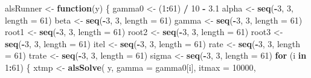 \documentclass[
  12pt,
]{article}
\newenvironment{Shaded}{\begin{snugshade}}{\end{snugshade}}
\newcommand{\AttributeTok}[1]{\textcolor[rgb]{0.13,0.29,0.53}{#1}}
\newcommand{\ControlFlowTok}[1]{\textcolor[rgb]{0.13,0.29,0.53}{\textbf{#1}}}
\newcommand{\DecValTok}[1]{\textcolor[rgb]{0.00,0.00,0.81}{#1}}
\newcommand{\FloatTok}[1]{\textcolor[rgb]{0.00,0.00,0.81}{#1}}
\newcommand{\FunctionTok}[1]{\textcolor[rgb]{0.13,0.29,0.53}{\textbf{#1}}}
\newcommand{\NormalTok}[1]{#1}
\newcommand{\OtherTok}[1]{\textcolor[rgb]{0.56,0.35,0.01}{#1}}
\newcommand{\SpecialCharTok}[1]{\textcolor[rgb]{0.81,0.36,0.00}{\textbf{#1}}}
\begin{document}
\begin{Shaded}
\begin{Highlighting}[]
\NormalTok{alsRunner }\OtherTok{\textless{}{-}} \ControlFlowTok{function}\NormalTok{(y) \{}
\NormalTok{  gamma0 }\OtherTok{\textless{}{-}}\NormalTok{ (}\DecValTok{1}\SpecialCharTok{:}\DecValTok{61}\NormalTok{) }\SpecialCharTok{/} \DecValTok{10} \SpecialCharTok{{-}} \FloatTok{3.1}
\NormalTok{  alpha }\OtherTok{\textless{}{-}} \FunctionTok{seq}\NormalTok{(}\SpecialCharTok{{-}}\DecValTok{3}\NormalTok{, }\DecValTok{3}\NormalTok{, }\AttributeTok{length =} \DecValTok{61}\NormalTok{)}
\NormalTok{  beta }\OtherTok{\textless{}{-}} \FunctionTok{seq}\NormalTok{(}\SpecialCharTok{{-}}\DecValTok{3}\NormalTok{, }\DecValTok{3}\NormalTok{, }\AttributeTok{length =} \DecValTok{61}\NormalTok{)}
\NormalTok{  gamma }\OtherTok{\textless{}{-}} \FunctionTok{seq}\NormalTok{(}\SpecialCharTok{{-}}\DecValTok{3}\NormalTok{, }\DecValTok{3}\NormalTok{, }\AttributeTok{length =} \DecValTok{61}\NormalTok{)}
\NormalTok{  root1 }\OtherTok{\textless{}{-}} \FunctionTok{seq}\NormalTok{(}\SpecialCharTok{{-}}\DecValTok{3}\NormalTok{, }\DecValTok{3}\NormalTok{, }\AttributeTok{length =} \DecValTok{61}\NormalTok{)}
\NormalTok{  root2 }\OtherTok{\textless{}{-}} \FunctionTok{seq}\NormalTok{(}\SpecialCharTok{{-}}\DecValTok{3}\NormalTok{, }\DecValTok{3}\NormalTok{, }\AttributeTok{length =} \DecValTok{61}\NormalTok{)}
\NormalTok{  root3 }\OtherTok{\textless{}{-}} \FunctionTok{seq}\NormalTok{(}\SpecialCharTok{{-}}\DecValTok{3}\NormalTok{, }\DecValTok{3}\NormalTok{, }\AttributeTok{length =} \DecValTok{61}\NormalTok{)}
\NormalTok{  itel }\OtherTok{\textless{}{-}} \FunctionTok{seq}\NormalTok{(}\SpecialCharTok{{-}}\DecValTok{3}\NormalTok{, }\DecValTok{3}\NormalTok{, }\AttributeTok{length =} \DecValTok{61}\NormalTok{)}
\NormalTok{  rate }\OtherTok{\textless{}{-}} \FunctionTok{seq}\NormalTok{(}\SpecialCharTok{{-}}\DecValTok{3}\NormalTok{, }\DecValTok{3}\NormalTok{, }\AttributeTok{length =} \DecValTok{61}\NormalTok{)}
\NormalTok{  trate }\OtherTok{\textless{}{-}} \FunctionTok{seq}\NormalTok{(}\SpecialCharTok{{-}}\DecValTok{3}\NormalTok{, }\DecValTok{3}\NormalTok{, }\AttributeTok{length =} \DecValTok{61}\NormalTok{)}
\NormalTok{  sigma }\OtherTok{\textless{}{-}} \FunctionTok{seq}\NormalTok{(}\SpecialCharTok{{-}}\DecValTok{3}\NormalTok{, }\DecValTok{3}\NormalTok{, }\AttributeTok{length =} \DecValTok{61}\NormalTok{)}
  \ControlFlowTok{for}\NormalTok{ (i }\ControlFlowTok{in} \DecValTok{1}\SpecialCharTok{:}\DecValTok{61}\NormalTok{) \{}
\NormalTok{    xtmp }\OtherTok{\textless{}{-}}
      \FunctionTok{alsSolve}\NormalTok{(}
\NormalTok{        y,}
        \AttributeTok{gamma =}\NormalTok{ gamma0[i],}
        \AttributeTok{itmax =} \DecValTok{10000}\NormalTok{,}

\end{Highlighting}
\end{Shaded}
\end{document}
